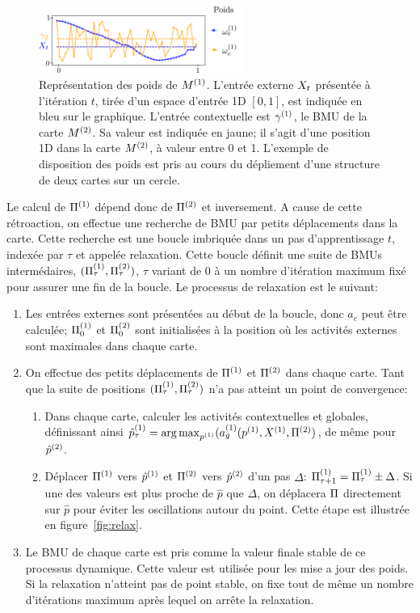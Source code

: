 \begin{figure}
\centering
\includegraphics[width=0.6\textwidth]{weights_2som.pdf}
\caption{Représentation des poids de $M^{({1})}$. L'entrée externe $X_t$ présentée à l'itération $t$, tirée d'un espace d'entrée 1D $[0,1]$, est indiquée en bleu sur le graphique. L'entrée contextuelle  est $\gamma^{({1})}$, le BMU de la carte $M^{({2})}$. Sa valeur est indiquée en jaune; il s'agit d'une position 1D dans la carte $M^{({2})}$, à valeur entre 0 et 1. L'exemple de disposition des poids est pris au cours du dépliement d'une structure de deux cartes sur un cercle. \label{fig:2som_weights}}
\end{figure}

Le calcul de $\Pi^{({1})}$ dépend donc de $\Pi^{({2})}$ et inversement. A cause de cette rétroaction, on effectue une recherche de BMU par petits déplacements dans la carte. Cette recherche est une boucle imbriquée dans un pas d'apprentissage $t$, indexée par $\tau$ et appelée relaxation. Cette boucle définit une suite de BMUs intermédaires, $(\Pi^{({1})}_\tau , \Pi^{({2})}_\tau)$, $\tau$ variant de $0$ à un nombre d'itération maximum fixé pour assurer une fin de la boucle. Le processus de relaxation est le suivant:
\begin{enumerate}
\item Les entrées externes sont présentées au début de la boucle, donc $a_e$ peut être calculée; $\Pi^{({1})}_0$ et $\Pi^{({2})}_0$ sont initialisées à la position où les activités externes sont maximales dans chaque carte. 
\item On effectue des petits déplacements de $\Pi^{({1})}$ et $\Pi^{({2})}$ dans chaque carte. Tant que la suite de positions $(\Pi^{({1})}_\tau,\Pi^{({2})}_\tau)$ n'a pas atteint un point de convergence:
	\begin{enumerate}
	\item Dans chaque carte, calculer les activités contextuelles et globales, définissant ainsi $\hat{p}^{({1})}_\tau = \operatorname*{arg\,max}_{p^{({1})}}(a_g^{({1})}(p^{({1})},X^{({1})}, \Pi^{({2})})$, de même pour $\hat{p}^{({2})}$.
	\item Déplacer $\Pi^{({1})}$ vers $\hat{p}^{({1})}$ et $\Pi^{({2})}$ vers $\hat{p}^{({2})}$ d'un pas $\Delta$: $\Pi^{({1})}_{\tau+1} = \Pi^{({1})}_{\tau} \pm \Delta$.
	Si une des valeurs est plus proche de $\hat{p}$ que $\Delta$, on déplacera $\Pi$ directement sur $\hat{p}$ pour éviter les oscillations autour du point. Cette étape est illustrée en figure~\ref{fig:relax}.
	\end{enumerate}
\item Le BMU de chaque carte est pris comme la valeur finale stable de ce processus dynamique. Cette valeur est utilisée pour les mise a jour des poids. Si la relaxation n'atteint pas de point stable, on fixe tout de même un nombre d'itérations maximum après lequel on arrête la relaxation.
\end{enumerate}

